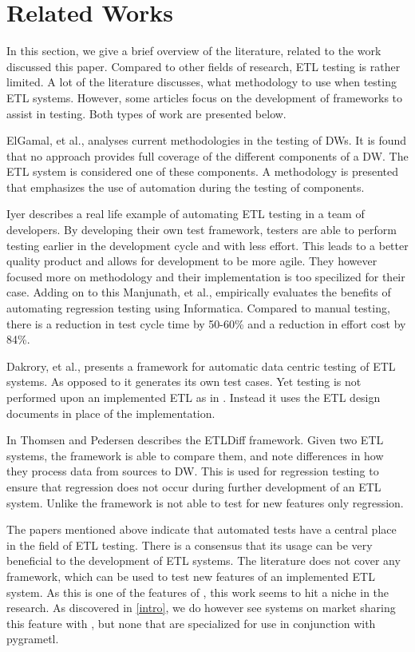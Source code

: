\section{Related Works}\label{sect:RelatedWorks}
In this section, we give a brief overview of the literature, related to the work discussed this paper. Compared to other fields of research, ETL testing is rather limited. A lot of the literature discusses, what methodology to use when testing ETL systems. However, some articles focus on the development of frameworks to assist in testing. Both types of work are presented below.

ElGamal, et al.,  \cite{elgamal2012towards} analyses current methodologies in the testing of DWs. It is found that no approach provides full coverage of the different components of a DW. The ETL system is considered one of these components. A methodology is presented that emphasizes the use of automation during the testing of components.

Iyer \cite{subuiyer2014} describes a real life example of automating ETL testing in a team of developers. By developing their own test framework, testers are able to perform testing earlier in the development cycle and with less effort. This leads to a better quality product and allows for development to be more agile. They however focused more on methodology and their implementation is too specilized for their case. Adding on to this Manjunath, et al., \cite{manjunath2012case} empirically evaluates the benefits of automating regression testing using Informatica. Compared to manual testing, there is a reduction in test cycle time by 50-60\% and a reduction in effort cost by 84\%.

Dakrory, et al.,  \cite{dakroryautomated} presents a framework for automatic data centric testing of ETL systems. As opposed to \FW{} it generates its own test cases. Yet testing is not performed upon an implemented ETL as in \FW{}. Instead it uses the ETL design documents in place of the implementation.

In \cite{thomsen2006etldiff} Thomsen and Pedersen describes the ETLDiff framework. Given two ETL systems, the framework is able to compare them, and note differences in how they process data from sources to DW. This is used for regression testing to ensure that regression does not occur during further development of an ETL system. Unlike \FW the framework is not able to test for new features only regression.

The papers mentioned above indicate that automated tests have a central place in the field of ETL testing. There is a consensus that its usage can be very beneficial to the development of ETL systems. The literature does not cover any framework, which can be used to test new features of an implemented ETL system. As this is one of the features of \FW{}, this work seems to hit a niche in the research. As discovered in \cref{intro}, we do however see systems on market sharing this feature with \FW{}, but none that are specialized for use in conjunction with pygrametl.
